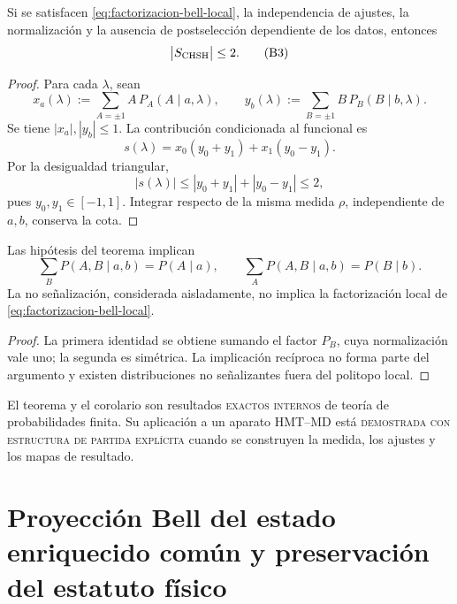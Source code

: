 \begin{theorem}
\label{thm:cota-chsh-local}
Si se satisfacen \eqref{eq:factorizacion-bell-local}, la independencia de
ajustes, la normalización y la ausencia de postselección dependiente de los
datos, entonces
\[
 \bigl|S_{\rm CHSH}\bigr|\leq2.
 \tag{B3}\label{eq:cota-chsh-dos}
\]
\end{theorem}

\begin{proof}
Para cada \(\lambda\), sean
\[
 x_a(\lambda):=\sum_{A=\pm1}A\,P_A(A\mid a,\lambda),
 \qquad
 y_b(\lambda):=\sum_{B=\pm1}B\,P_B(B\mid b,\lambda).
\]
Se tiene \(|x_a|,|y_b|\leq1\). La contribución condicionada al funcional es
\[
 s(\lambda)
 =x_0(y_0+y_1)+x_1(y_0-y_1).
\]
Por la desigualdad triangular,
\[
 |s(\lambda)|
 \leq |y_0+y_1|+|y_0-y_1|\leq2,
\]
pues \(y_0,y_1\in[-1,1]\). Integrar respecto de la misma medida \(\rho\),
independiente de \(a,b\), conserva la cota.
\end{proof}

\begin{corollary}
\label{cor:no-senalizacion-bell}
Las hipótesis del teorema implican
\[
 \sum_B P(A,B\mid a,b)=P(A\mid a),
 \qquad
 \sum_A P(A,B\mid a,b)=P(B\mid b).
 \tag{B4}\label{eq:no-senalizacion-bell}
\]
La no señalización, considerada aisladamente, no implica la factorización
local de \eqref{eq:factorizacion-bell-local}.
\end{corollary}

\begin{proof}
La primera identidad se obtiene sumando el factor \(P_B\), cuya
normalización vale uno; la segunda es simétrica. La implicación recíproca no
forma parte del argumento y existen distribuciones no señalizantes fuera del
politopo local.
\end{proof}

\begin{statusbox}
El teorema y el corolario son resultados
\textsc{exactos internos} de teoría de probabilidades finita. Su aplicación
a un aparato HMT--MD está
\textsc{demostrada con estructura de partida explícita} cuando se construyen
la medida, los ajustes y los mapas de resultado.
\end{statusbox}

\section{Proyección Bell del estado enriquecido común y preservación del estatuto físico}
\label{sec:estado-enriquecido-bell}

